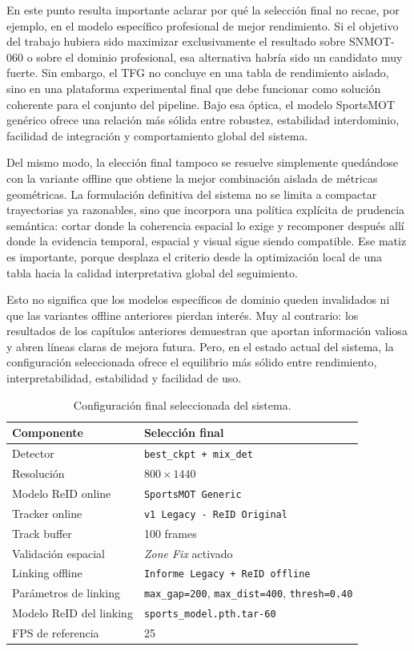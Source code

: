 \documentclass[../MAIN.tex]{subfiles}
\begin{document}
	En este punto resulta importante aclarar por qué la selección final no recae, por ejemplo, en el modelo específico profesional de mejor rendimiento. Si el objetivo del trabajo hubiera sido maximizar exclusivamente el resultado sobre SNMOT-060 o sobre el dominio profesional, esa alternativa habría sido un candidato muy fuerte. Sin embargo, el TFG no concluye en una tabla de rendimiento aislado, sino en una plataforma experimental final que debe funcionar como solución coherente para el conjunto del pipeline. Bajo esa óptica, el modelo SportsMOT genérico ofrece una relación más sólida entre robustez, estabilidad interdominio, facilidad de integración y comportamiento global del sistema.
	
	Del mismo modo, la elección final tampoco se resuelve simplemente quedándose con la variante offline que obtiene la mejor combinación aislada de métricas geométricas. La formulación definitiva del sistema no se limita a compactar trayectorias ya razonables, sino que incorpora una política explícita de prudencia semántica: cortar donde la coherencia espacial lo exige y recomponer después allí donde la evidencia temporal, espacial y visual sigue siendo compatible. Ese matiz es importante, porque desplaza el criterio desde la optimización local de una tabla hacia la calidad interpretativa global del seguimiento.
	
	Esto no significa que los modelos específicos de dominio queden invalidados ni que las variantes offline anteriores pierdan interés. Muy al contrario: los resultados de los capítulos anteriores demuestran que aportan información valiosa y abren líneas claras de mejora futura. Pero, en el estado actual del sistema, la configuración seleccionada ofrece el equilibrio más sólido entre rendimiento, interpretabilidad, estabilidad y facilidad de uso.
	
	\begin{table}[H]
		\centering
		\caption{Configuración final seleccionada del sistema.}
		\label{tab:cap13_pipeline_final}
		\begin{tabular}{p{4.1cm}p{8.4cm}}
			\toprule
			\textbf{Componente} & \textbf{Selección final} \\
			\midrule
			Detector & \texttt{best\_ckpt + mix\_det} \\
			Resolución & \(800\times1440\) \\
			Modelo ReID online & \texttt{SportsMOT Generic} \\
			Tracker online & \texttt{v1 Legacy - ReID Original} \\
			Track buffer & 100 frames \\
			Validación espacial & \textit{Zone Fix} activado \\
			Linking offline & \texttt{Informe Legacy + ReID offline} \\
			Parámetros de linking & \texttt{max\_gap=200}, \texttt{max\_dist=400}, \texttt{thresh=0.40} \\
			Modelo ReID del linking & \texttt{sports\_model.pth.tar-60} \\
			FPS de referencia & 25 \\
			\bottomrule
		\end{tabular}
	\end{table}
	
\end{document}
